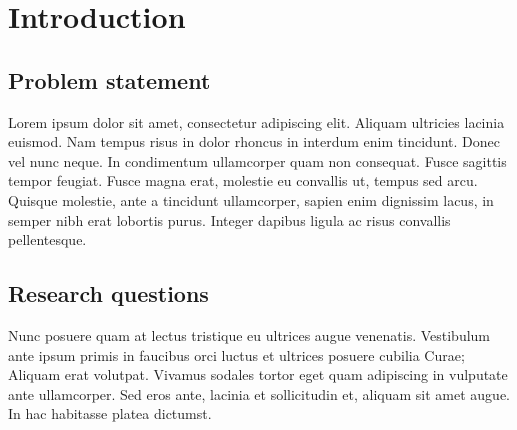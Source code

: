 
\chapter{Introduction} %

\label{Chapter1} %

\section{Problem statement}

Lorem ipsum dolor sit amet, consectetur adipiscing elit. Aliquam ultricies lacinia
euismod. Nam tempus risus in dolor rhoncus in interdum enim tincidunt. Donec vel nunc
neque. In condimentum ullamcorper quam non consequat. Fusce sagittis tempor feugiat. Fusce
magna erat, molestie eu convallis ut, tempus sed arcu. Quisque molestie, ante a tincidunt
ullamcorper, sapien enim dignissim lacus, in semper nibh erat lobortis purus. Integer
dapibus ligula ac risus convallis pellentesque.


\section{Research questions}

Nunc posuere quam at lectus tristique eu ultrices augue venenatis. Vestibulum ante ipsum
primis in faucibus orci luctus et ultrices posuere cubilia Curae; Aliquam erat volutpat.
Vivamus sodales tortor eget quam adipiscing in vulputate ante ullamcorper. Sed eros ante,
lacinia et sollicitudin et, aliquam sit amet augue. In hac habitasse platea dictumst.